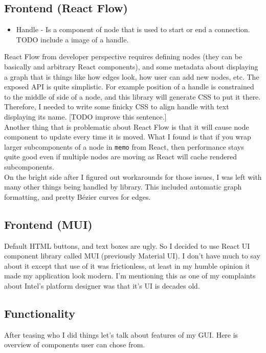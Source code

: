 \documentclass[12pt]{report}
\begin{document}
\subsection{Frontend (React Flow)}
\begin{tcolorbox}[title=Vocabulary]
    \begin{itemize}
        \item Handle - Is a component of node that is used to start or end a connection. TODO include a image of a handle.
    \end{itemize}
\end{tcolorbox}
React Flow from developer perspective requires defining nodes (they can be basically and arbitrary React components), and some metadata about displaying a graph that is things like how edges look, how user can add new nodes, etc. 
The exposed API is quite simplistic. 
For example position of a handle is constrained to the middle of side of a node, and this library will generate CSS to put it there. 
Therefore, I needed to write some finicky CSS to align handle with text displaying its name. [TODO improve this sentence.]
\\
Another thing that is problematic about React Flow is that it will cause node component to update every time it is moved. 
What I found is that if you wrap larger subcomponents of a node in \verb!memo! from React, then performance stays quite good even if multiple nodes are moving as React will cache rendered subcomponents.  
\\
On the bright side after I figured out workarounds for those issues, I was left with many other things being handled by library. This included automatic graph formatting, and pretty Bézier curves for edges. 

\subsection{Frontend (MUI)}
Default HTML buttons, and text boxes are ugly. So I decided to use React UI component library called MUI (previously Material UI). I don't have much to say about it except that use of it was frictionless, at least in my humble opinion it made my application look modern. I'm mentioning this as one of my complaints about Intel's platform designer was that it's UI is decades old.

\subsection{Functionality}
After teasing who I did things let's talk about features of my GUI. Here is overview of components user can chose from.
\end{document}
